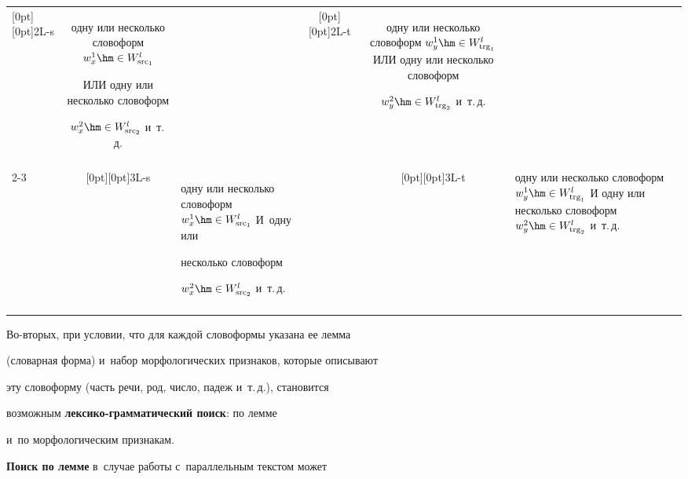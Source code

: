 \begin{table}[b]
\begin{center}
\begin{tabular}{|p{15mm}|c|p{40mm}|c|c|p{40mm}|}
\raisebox{-16pt}[0pt][0pt]{2L-s}&одну или несколько словоформ $w_x^1\hm\in  W^l_{\mathrm{src}_1}$ 


ИЛИ одну или несколько словоформ


$w_x^2\hm\in  W^l_{\mathrm{src}_2}$ и~т.\,д.&&\raisebox{-16pt}[0pt][0pt]{2L-t}&одну или несколько словоформ $w_y^1\hm\in 


W^l_{\mathrm{trg}_1}$ ИЛИ одну или несколько словоформ


$w_y^2\hm\in W^l_{\mathrm{trg}_2}$ и~т.\,д.\\


&&&&&\\[-9pt]


\cline{2-3}


\cline{5-6}


&\raisebox{-16pt}[0pt][0pt]{3L-s}&одну или несколько словоформ $w_x^1\hm\in  W^l_{\mathrm{src}_1}$ И~одну или 


несколько словоформ


$w_x^2\hm\in  W^l_{\mathrm{src}_2}$ и~т.\,д.&&\raisebox{-16pt}[0pt][0pt]{3L-t}&одну или несколько словоформ $w_y^1\hm\in 


W^l_{\mathrm{trg}_1}$ И одну или несколько словоформ $w_y^2\hm\in W^l_{\mathrm{trg}_2}$ и~т.\,д.\\[-9pt]


&&&&&\\


\hline


\end{tabular}


\end{center}


\end{table}








Во-вторых, при условии, что для каждой словоформы указана ее лемма 


(словарная форма) и~набор морфологических признаков, которые описывают 


эту словоформу (часть речи, род, число, падеж и~т.\,д.), становится 


возможным \textbf{лек\-си\-ко-грам\-ма\-ти\-че\-ский поиск}: по лемме 


и~по морфологическим признакам.





\textbf{Поиск по лемме} в~случае работы с~параллельным текстом может 


